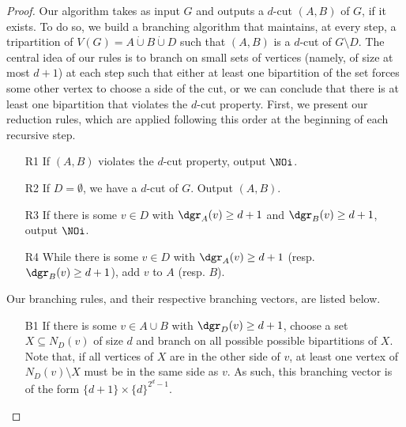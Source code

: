 \documentclass[a4paper,UKenglish,cleveref, autoref]{lipics-v2019}
\begin{document}
\begin{proof}
    Our algorithm takes as input $G$ and outputs a $d$-cut $(A, B)$ of $G$, if it exists.
    To do so, we build a branching algorithm that maintains, at every step, a tripartition of $V(G) = A \dot\cup B \dot\cup D$ such that $(A, B)$ is a $d$-cut of $G \setminus D$.
    The central idea of our rules is to branch on small  sets of vertices (namely, of size at most $d+1$) at each step such that either at least one bipartition of the set forces some other vertex to choose a side of the cut, or we can conclude that there is at least one bipartition that violates the $d$-cut property.
    First, we present our reduction rules, which are applied following this order at the beginning of each recursive step.

    \begin{itemize}
        \item[R1] If $(A, B)$ violates the $d$-cut property, output $\NOi$.
        \item[R2] If $D = \emptyset$, we have a $d$-cut of $G$. Output $(A,B)$.
        \item[R3] If there is some $v \in D$ with $\dgr_A(v) \geq d + 1$ and $\dgr_B(v) \geq d+1$, output $\NOi$.
        \item[R4] While there is some $v \in D$ with $\dgr_A(v) \geq d + 1$ (resp. $\dgr_B(v) \geq d+1$), add $v$ to $A$ (resp. $B$).
    \end{itemize}

    Our branching rules, and their respective branching vectors, are listed below.

    \begin{itemize}
        \item[B1] If there is some $v \in A \cup B$ with $\dgr_D(v) \geq d+1$, choose a set $X \subseteq N_D(v)$ of size $d$ and branch on all possible possible bipartitions of $X$.
        Note that, if all vertices of $X$ are in the other side of $v$, at least one vertex of $N_D(v) \setminus X$ must be in the same side as $v$.
        As such, this branching vector is of the form $\{d+1\} \times \{d\}^{2^d-1}$.



\end{itemize}
\end{proof}
\end{document}
